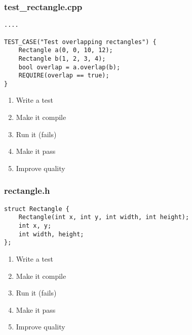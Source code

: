 \begin{frame}[fragile]
\frametitle{test\_rectangle.cpp}
\begin{minipage}[t]{0.48\linewidth}
\begin{lstlisting}
....

TEST_CASE("Test overlapping rectangles") {
    Rectangle a(0, 0, 10, 12);
    Rectangle b(1, 2, 3, 4);
    bool overlap = a.overlap(b);
    REQUIRE(overlap == true);
}
\end{lstlisting}
\end{minipage}\hfill
\begin{minipage}[t]{0.28\linewidth}
  \small
  \begin{enumerate} 
    \item \textcolor{deadcolor}{Write a test}
    \item \textcolor{activecolor}{Make it compile}
    \item \textcolor{deadcolor}{Run it (fails)}
    \item \textcolor{deadcolor}{Make it pass}
    \item \textcolor{deadcolor}{Improve quality}
  \end{enumerate} 
\end{minipage}
\end{frame}

\begin{frame}[fragile]
\frametitle{rectangle.h}
\begin{minipage}[t]{0.48\linewidth}
\begin{lstlisting}
struct Rectangle {
    Rectangle(int x, int y, int width, int height);
    int x, y;
    int width, height;
};
\end{lstlisting}
\end{minipage}\hfill
\begin{minipage}[t]{0.28\linewidth}
  \small
  \begin{enumerate} 
    \item \textcolor{deadcolor}{Write a test}
    \item \textcolor{activecolor}{Make it compile}
    \item \textcolor{deadcolor}{Run it (fails)}
    \item \textcolor{deadcolor}{Make it pass}
    \item \textcolor{deadcolor}{Improve quality}
  \end{enumerate} 
\end{minipage}
\end{frame}

